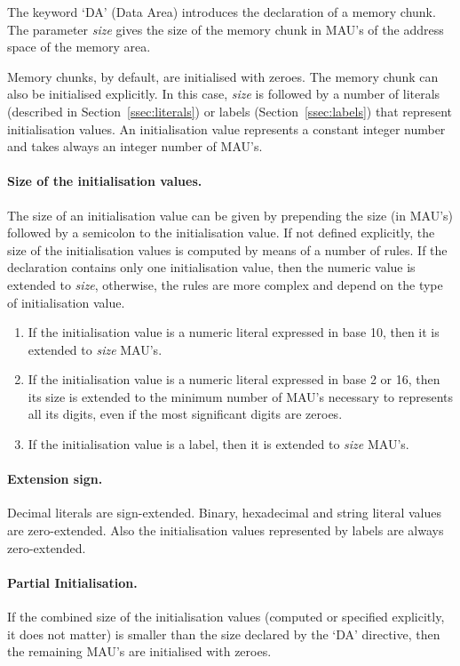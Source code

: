 \documentclass[a4paper,twoside]{tceusermanual}
\begin{document}
The keyword `DA' (Data Area) introduces the declaration of a memory chunk.
The parameter \emph{size} gives the size of the memory chunk in MAU's of the
address space of the memory area.

Memory chunks, by default, are initialised with zeroes. The memory chunk can
also be initialised explicitly. In this case, \emph{size} is followed by a
number of literals (described in Section~\ref{ssec:literals}) or labels
(Section~\ref{ssec:labels}) that represent initialisation values.
%
An initialisation value represents a constant integer number and takes
always an integer number of MAU's.

\paragraph{Size of the initialisation values.}
The size of an initialisation value can be given by prepending the size (in
MAU's) followed by a semicolon to the initialisation value.
%
If not defined explicitly, the size of the initialisation values is computed
by means of a number of rules. If the declaration contains only one
initialisation value, then the numeric value is extended to \emph{size},
otherwise, the rules are more complex and depend on the type of
initialisation value.

\begin{enumerate}
\item %
  If the initialisation value is a numeric literal expressed in base 10,
  then it is extended to \emph{size} MAU's.
\item %
  If the initialisation value is a numeric literal expressed in base 2 or
  16, then its size is extended to the minimum number of MAU's necessary to
  represents all its digits, even if the most significant digits are zeroes.
\item %
  If the initialisation value is a label, then it is extended to \emph{size}
  MAU's.
\end{enumerate}

\paragraph{Extension sign.}
Decimal literals are sign-extended. Binary, hexadecimal and string literal
values are zero-extended. Also the initialisation values represented by
labels are always zero-extended.

\paragraph{Partial Initialisation.}
If the combined size of the initialisation values (computed or specified
explicitly, it does not matter) is smaller than the size declared by the `DA'
directive, then the remaining MAU's are initialised with zeroes.
\end{document}
